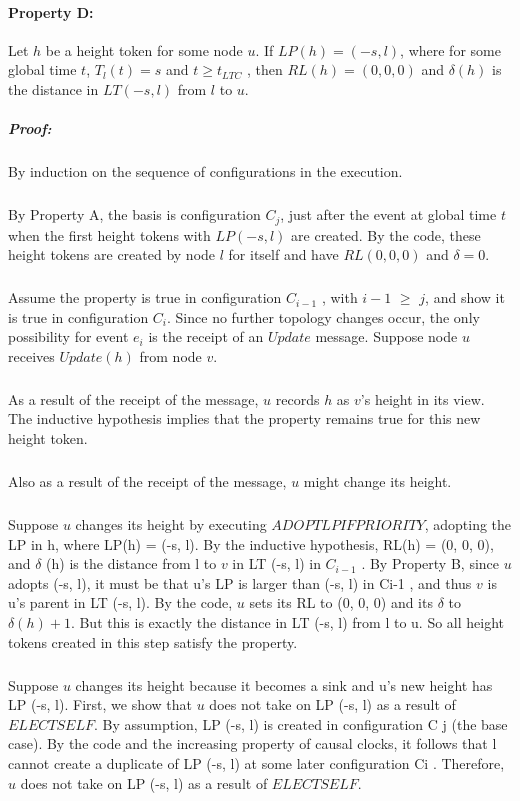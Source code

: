 \paragraph{Property D:}Let $h$ be a height token for some node $u$. If $LP(h) = (-s, l)$, where for some global time $t$, $T_l (t) = s$ and $t \geq t_{LTC}$ , then $RL(h) = (0, 0, 0)$ and $\delta (h)$ is the distance in $LT (-s, l)$ from $l$ to $u$.
\subparagraph{Proof:}By induction on the sequence of configurations in the execution.
\subparagraph{}By Property A, the basis is configuration $C_j$, just after the event at global time $t$ when the first height tokens with $LP (-s, l)$ are created. By the code, these height tokens are created by node $l$ for itself and have $RL (0, 0, 0)$ and $\delta = 0$.
\subparagraph{}Assume the property is true in configuration $C_{i-1}$ , with $i-1$ $\geq$ $j$, and show it is true in configuration $C_i$. Since no further topology changes occur, the only possibility for event $e_i$ is the receipt of an $Update$ message. Suppose node $u$ receives $Update(h)$ from node $v$.
\subparagraph{}As a result of the receipt of the message, $u$ records $h$ as $v$'s height in its view. The inductive hypothesis implies that the property remains true for this new height token.
\subparagraph{}Also as a result of the receipt of the message, $u$ might change its height.
\subparagraph{}Suppose $u$ changes its height by executing $ADOPTLPIFPRIORITY$, adopting the LP in h, where LP(h) = (-s, l). By the inductive hypothesis, RL(h) = (0, 0, 0), and $\delta$ (h) is the distance from l to $v$ in LT (-s, l) in $C_{i-1}$ . By Property B, since $u$ adopts (-s, l), it must be that u's LP is larger than (-s, l) in Ci-1 , and thus $v$ is u's parent in LT (-s, l). By the code, $u$ sets its RL to (0, 0, 0) and its $\delta$ to $\delta (h) + 1$. But this is exactly the distance in LT (-s, l) from l to u. So all height tokens created in this step satisfy the property.
\subparagraph{}Suppose $u$ changes its height because it becomes a sink and u's new height has LP (-s, l). First, we show that $u$ does not take on LP (-s, l) as a result of $ELECTSELF$. By assumption, LP (-s, l) is created in configuration C j (the base case). By the code and the increasing property of causal clocks, it follows that l cannot create a duplicate of LP (-s, l) at some later configuration Ci . Therefore, $u$ does not take on LP (-s, l) as a result of $ELECTSELF$.
